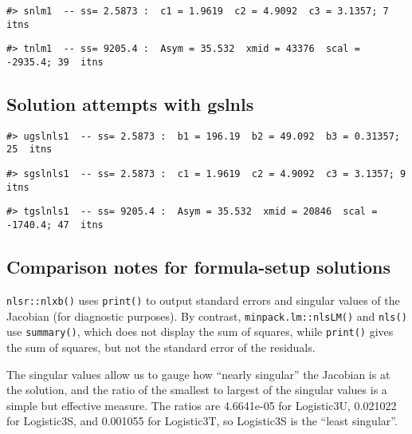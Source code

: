 \begin{verbatim}
#> snlm1  -- ss= 2.5873 :  c1 = 1.9619  c2 = 4.9092  c3 = 3.1357; 7  itns
\end{verbatim}

\begin{verbatim}
#> tnlm1  -- ss= 9205.4 :  Asym = 35.532  xmid = 43376  scal = -2935.4; 39  itns
\end{verbatim}

\hypertarget{solution-attempts-with-gslnls}{%
\subsection{Solution attempts with gslnls}\label{solution-attempts-with-gslnls}}

\begin{verbatim}
#> ugslnls1  -- ss= 2.5873 :  b1 = 196.19  b2 = 49.092  b3 = 0.31357; 25  itns
\end{verbatim}

\begin{verbatim}
#> sgslnls1  -- ss= 2.5873 :  c1 = 1.9619  c2 = 4.9092  c3 = 3.1357; 9  itns
\end{verbatim}

\begin{verbatim}
#> tgslnls1  -- ss= 9205.4 :  Asym = 35.532  xmid = 20846  scal = -1740.4; 47  itns
\end{verbatim}

\hypertarget{comparison-notes-for-formula-setup-solutions}{%
\subsection{Comparison notes for formula-setup solutions}\label{comparison-notes-for-formula-setup-solutions}}

\texttt{nlsr::nlxb()} uses \texttt{print()} to output standard errors and
singular values of the Jacobian (for diagnostic purposes). By contrast,
\texttt{minpack.lm::nlsLM()} and \texttt{nls()}
use \texttt{summary()}, which does not display the sum of squares, while \texttt{print()}
gives the sum of squares, but not the standard error of the residuals.

The singular values allow us to gauge how ``nearly singular'' the
Jacobian is at the solution, and the ratio of the smallest to largest of the
singular values is a simple but effective measure. The ratios are
4.6641e-05 for Logistic3U, 0.021022 for Logistic3S, and 0.001055 for
Logistic3T, so Logistic3S is the ``least singular''.


